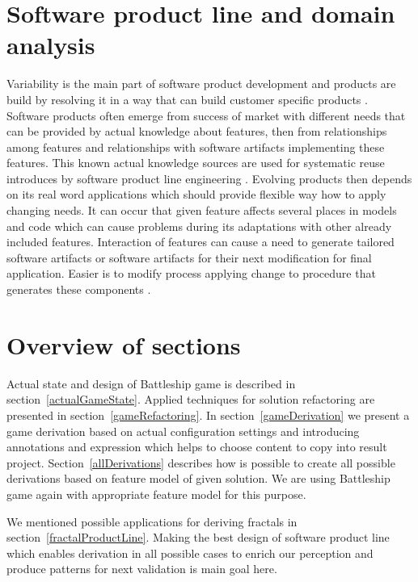 \documentclass[11pt,slovak,a4paper,twoside]{article}
\begin{document}
\section{Software product line and domain analysis} \label{domainAnalysis}

Variability is the main part of software product development and products are build by resolving it in a way that can build customer specific products \cite{botterweck_automating_2009}. Software products often emerge from success of market with different needs that can be provided by actual knowledge about features, then from relationships among features and relationships with software artifacts implementing these features. This known actual knowledge sources are used for systematic reuse introduces by software product line engineering \cite{reinhartz-berger_domain_2013}. Evolving products then depends on its real word applications which should provide flexible way how to apply changing needs. It can occur that given feature affects several places in models and code which can cause problems during its adaptations with other already included features. Interaction of features can cause a need to generate tailored software artifacts or software artifacts for their next modification for final application. Easier is to modify process applying change to procedure that generates these components \cite{vranic_features_2016}. 


\section{Overview of sections} \label{content}

Actual state and design of Battleship game is described in section~\ref{actualGameState}. Applied techniques for solution refactoring are presented in section~\ref{gameRefactoring}. In section~\ref{gameDerivation} we present a game derivation based on actual configuration settings and introducing annotations and expression which helps to choose content to copy into result project. 
Section~\ref{allDerivations} describes how is possible to create all possible derivations based on feature model of given solution. We are using Battleship game again with appropriate feature model for this purpose. 

We mentioned possible applications for deriving fractals in section~\ref{fractalProductLine}. Making the best design of software product line which enables derivation in all possible cases to enrich our perception and produce patterns for next validation is main goal here.  
\end{document}
